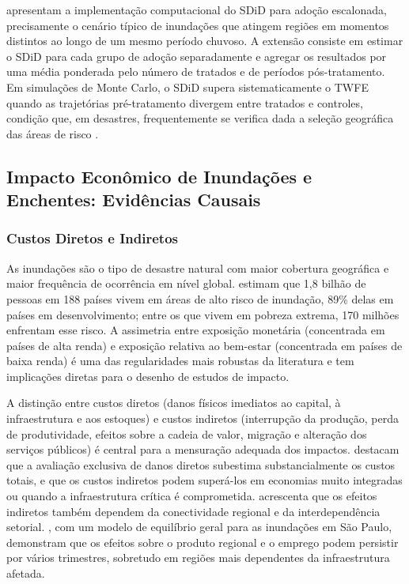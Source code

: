 \documentclass[a4paper,12pt]{article}
\begin{document}
 apresentam a implementação computacional do SDiD para
adoção escalonada, precisamente o cenário típico de inundações que atingem regiões em
momentos distintos ao longo de um mesmo período chuvoso. A extensão consiste em
estimar o SDiD para cada grupo de adoção separadamente e agregar os resultados por
uma média ponderada pelo número de tratados e de períodos pós-tratamento. Em
simulações de Monte Carlo, o SDiD supera sistematicamente o TWFE quando as
trajetórias pré-tratamento divergem entre tratados e controles, condição que, em
desastres, frequentemente se verifica dada a seleção geográfica das áreas de risco
\cite{arkhangelsky2021}.

\subsection{Impacto Econômico de Inundações e Enchentes: Evidências Causais}
\label{sub:impacto}

\subsubsection{Custos Diretos e Indiretos}

As inundações são o tipo de desastre natural com maior cobertura geográfica e maior
frequência de ocorrência em nível global.  estimam que 1,8
bilhão de pessoas em 188 países vivem em áreas de alto risco de inundação, 89\% delas
em países em desenvolvimento; entre os que vivem em pobreza extrema, 170 milhões
enfrentam esse risco. A assimetria entre exposição monetária (concentrada em países de
alta renda) e exposição relativa ao bem-estar (concentrada em países de baixa renda)
é uma das regularidades mais robustas da literatura \cite{mcdermott2022} e tem
implicações diretas para o desenho de estudos de impacto.

A distinção entre custos diretos (danos físicos imediatos ao capital, à infraestrutura e
aos estoques) e custos indiretos (interrupção da produção, perda de produtividade, efeitos
sobre a cadeia de valor, migração e alteração dos serviços públicos) é central para a
mensuração adequada dos impactos.  destacam que a avaliação
exclusiva de danos diretos subestima substancialmente os custos totais, e que os custos
indiretos podem superá-los em economias muito integradas ou quando a infraestrutura
crítica é comprometida.  acrescenta que os efeitos indiretos
também dependem da conectividade regional e da interdependência setorial.
, com um modelo de equilíbrio geral para as inundações
em São Paulo, demonstram que os efeitos sobre o produto regional e o emprego podem
persistir por vários trimestres, sobretudo em regiões mais dependentes da infraestrutura
afetada.
\end{document}

